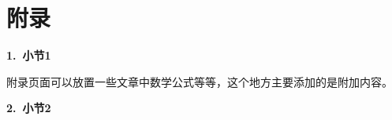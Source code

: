 
\chapter{附\qquad 录}

\noindent\songti\xiaosi\textbf{1.\ 小节1} 

附录页面可以放置一些文章中数学公式等等，这个地方主要添加的是附加内容。

\noindent \textbf{2.\ 小节2}



